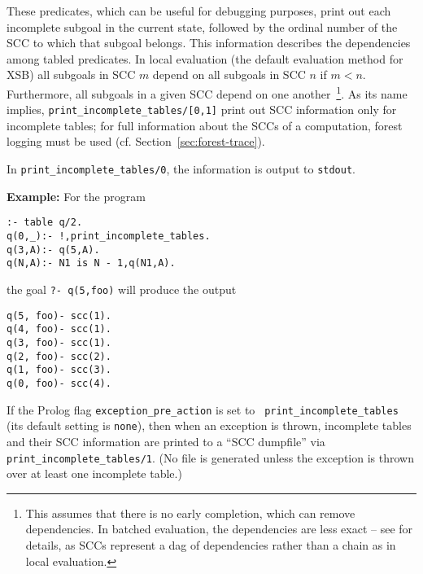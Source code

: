 \begin{description}
%
These predicates, which can be useful for debugging purposes, print
out each incomplete subgoal in the current state, followed by the
ordinal number of the SCC to which that subgoal belongs.  This
information describes the dependencies among tabled predicates.  In
local evaluation (the default evaluation method for XSB) all subgoals
in SCC $m$ depend on all subgoals in SCC $n$ if $m < n$.  Furthermore,
all subgoals in a given SCC depend on one another~\footnote{This
  assumes that there is no early completion, which can remove
  dependencies. In batched evaluation, the dependencies are less exact
  -- see \cite{SaSw98} for details, as SCCs represent a dag of
  dependencies rather than a chain as in local evaluation.}.  As its
name implies, {\tt print\_incomplete\_tables/[0,1]} print out SCC
information only for incomplete tables; for full information about the
SCCs of a computation, forest logging must be used
(cf. Section~\ref{sec:forest-trace}).

In {\tt print\_incomplete\_tables/0}, the information is output to
{\tt stdout}.

{\bf Example:} For the program
%
\begin{verbatim}
:- table q/2.
q(0,_):- !,print_incomplete_tables.
q(3,A):- q(5,A).
q(N,A):- N1 is N - 1,q(N1,A).
\end{verbatim}
the goal {\tt ?- q(5,foo)} will produce the output 
%
{\small
\begin{verbatim}
q(5, foo)- scc(1).
q(4, foo)- scc(1).
q(3, foo)- scc(1).
q(2, foo)- scc(2).
q(1, foo)- scc(3).
q(0, foo)- scc(4).
\end{verbatim}
}
%

%
If the Prolog flag {\tt exception\_pre\_action} is set to {\tt
  print\_incomplete\_tables} (its default setting is {\tt none}), then
when an exception is thrown, incomplete tables and their SCC
information are printed to a ``SCC dumpfile'' via {\tt
  print\_incomplete\_tables/1}.  (No file is generated unless
  the exception is thrown over at least one incomplete table.)


\end{description}
